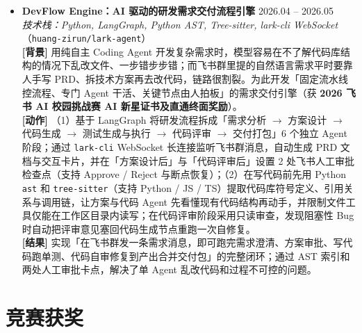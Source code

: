 \documentclass[10pt,letterpaper]{article}
\begin{document}
\begin{itemize}[leftmargin=10pt]
  \item \textbf{DevFlow Engine：AI 驱动的研发需求交付流程引擎} \hfill 2026.04 -- 2026.05 \\
  \emph{技术栈：Python, LangGraph, Python AST, Tree-sitter, lark-cli WebSocket}（\texttt{huang-zirun/lark-agent}） \\
  \textbf{[背景]} 用纯自主 Coding Agent 开发复杂需求时，模型容易在不了解代码库结构的情况下乱改文件、一步错步步错；而飞书群里提的自然语言需求平时要靠人手写 PRD、拆技术方案再去改代码，链路很割裂。为此开发「固定流水线控流程、专门 Agent 干活、关键节点由人拍板」的需求交付引擎（获 \textbf{2026 飞书 AI 校园挑战赛 AI 新星证书及直通终面奖励}）。 \\
  \textbf{[动作]} （1）基于 LangGraph 将研发流程拆成「需求分析 $\rightarrow$ 方案设计 $\rightarrow$ 代码生成 $\rightarrow$ 测试生成与执行 $\rightarrow$ 代码评审 $\rightarrow$ 交付打包」6 个独立 Agent 阶段；通过 \texttt{lark-cli} WebSocket 长连接监听飞书群消息，自动生成 PRD 文档与交互卡片，并在「方案设计后」与「代码评审后」设置 2 处飞书人工审批检查点（支持 Approve / Reject 与断点恢复）；（2）在写代码前先用 Python \texttt{ast} 和 \texttt{tree-sitter}（支持 Python / JS / TS）提取代码库符号定义、引用关系与调用链，让方案与代码 Agent 先看懂现有代码结构再动手，并限制文件工具仅能在工作区目录内读写；在代码评审阶段采用只读审查，发现阻塞性 Bug 时自动把评审意见塞回代码生成节点重跑一次自修复。 \\
  \textbf{[结果]} 实现「在飞书群发一条需求消息，即可跑完需求澄清、方案审批、写代码跑单测、代码自审修复到产出合并交付包」的完整闭环；通过 AST 索引和两处人工审批卡点，解决了单 Agent 乱改代码和过程不可控的问题。
\end{itemize}

\section{竞赛获奖}
\end{document}
